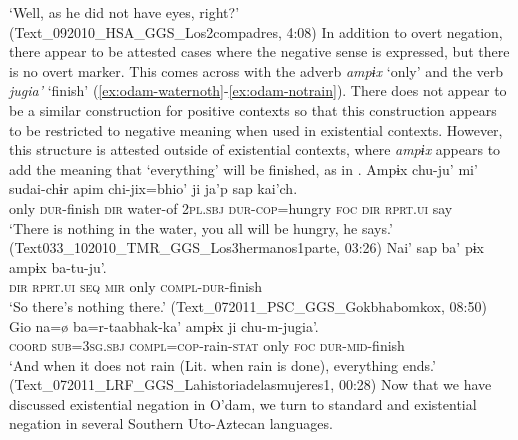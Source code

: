 \documentclass[output=paper,draft,draftmode,colorlinks,citecolor=brown]{langscibook}
\begin{document}
\glt ‘Well, as he did not have eyes, right?’ (Text\_092010\_HSA\_GGS\_Los2compadres, 4:08)
\z 
In addition to overt negation, there appear to be attested cases where the negative sense is expressed, but there is no overt marker. This comes across with the adverb \emph{ampɨx} ‘only’ and the verb \emph{jugia'} ‘finish’ (\ref{ex:odam-waternoth}-\ref{ex:odam-notrain}). There does not appear to be a similar construction for positive contexts so that this construction appears to be restricted to negative meaning when used in existential contexts. However, this structure is attested outside of existential contexts, where \emph{ampɨx} appears to add the meaning that ‘everything’ will be finished, as in .
\ea
\label{ex:odam-waternoth}
\gll Ampɨx chu-ju’ 	mi’ 	sudai-chɨr 	apim 		chi-jix=bhio' ji	ja’p 	sap 		kai'ch.\\
only	\textsc{dur}-finish	\textsc{dir}	water-of	\textsc{2pl.sbj}	\textsc{dur-cop}=hungry \textsc{foc}	\textsc{dir}	\textsc{rprt.ui}	say\\
\glt ‘There is nothing in the water, you all will be hungry, he says.’ (Text033\_102010\_TMR\_GGS\_Los3hermanos1parte, 03:26)
\z 
\ea
\label{ex:odam-noththere}
\gll Nai' 	sap 		ba' 	pɨx 	ampɨx 	ba-tu-ju'.\\
\textsc{dir}	\textsc{rprt.ui}	\textsc{seq}	\textsc{mir}	only	\textsc{compl-dur}-finish\\
\glt ‘So there’s nothing there.’ (Text\_072011\_PSC\_GGS\_Gokbhabomkox, 08:50)
\z 
\ea
\label{ex:odam-notrain}
\gll Gio	   {na=\o} 		{ba=r-taabhak-ka’} 	ampɨx 	ji 	chu-m-jugia’.\\
\textsc{coord} \textsc{sub=3sg.sbj} 	\textsc{compl=cop}-rain-\textsc{stat} 	only 	\textsc{foc} 	\textsc{dur-mid}-finish\\
\glt ‘And when it does not rain (Lit. when rain is done), everything ends.’ (Text\_072011\_LRF\_GGS\_Lahistoriadelasmujeres1, 00:28)
\z 
Now that we have discussed existential negation in O’dam, we turn to standard and existential negation in several Southern Uto-Aztecan languages.
\end{document}
